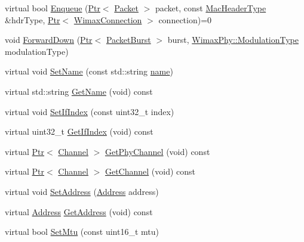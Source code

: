 \begin{DoxyCompactItemize}
\item 
virtual bool \hyperlink{classns3_1_1WimaxNetDevice_a72a88b990dc72d44713cdb170d304e83}{Enqueue} (\hyperlink{classns3_1_1Ptr}{Ptr}$<$ \hyperlink{classns3_1_1Packet}{Packet} $>$ packet, const \hyperlink{classns3_1_1MacHeaderType}{Mac\+Header\+Type} \&hdr\+Type, \hyperlink{classns3_1_1Ptr}{Ptr}$<$ \hyperlink{classns3_1_1WimaxConnection}{Wimax\+Connection} $>$ connection)=0
\item 
void \hyperlink{classns3_1_1WimaxNetDevice_af484194cd18f49cb532794513636f2b9}{Forward\+Down} (\hyperlink{classns3_1_1Ptr}{Ptr}$<$ \hyperlink{classns3_1_1PacketBurst}{Packet\+Burst} $>$ burst, \hyperlink{classns3_1_1WimaxPhy_a044c5d8a48ca992c39c2a946f6e755fa}{Wimax\+Phy\+::\+Modulation\+Type} modulation\+Type)
\item 
virtual void \hyperlink{classns3_1_1WimaxNetDevice_a3e606df0807d4d5e45716fb138dc888e}{Set\+Name} (const std\+::string \hyperlink{generate__test__data__lte__spectrum__model_8m_ab74e6bf80237ddc4109968cedc58c151}{name})
\item 
virtual std\+::string \hyperlink{classns3_1_1WimaxNetDevice_a013da267d69cff1f08f04eea031f2d98}{Get\+Name} (void) const 
\item 
virtual void \hyperlink{classns3_1_1WimaxNetDevice_a4aad711890d681c43a710c6d52d8db48}{Set\+If\+Index} (const uint32\+\_\+t index)
\item 
virtual uint32\+\_\+t \hyperlink{classns3_1_1WimaxNetDevice_ab4198f8199d25995168ee18eb60db937}{Get\+If\+Index} (void) const 
\item 
virtual \hyperlink{classns3_1_1Ptr}{Ptr}$<$ \hyperlink{classns3_1_1Channel}{Channel} $>$ \hyperlink{classns3_1_1WimaxNetDevice_abbd7ff170f367e0e6e980c5b0d3ab81e}{Get\+Phy\+Channel} (void) const 
\item 
virtual \hyperlink{classns3_1_1Ptr}{Ptr}$<$ \hyperlink{classns3_1_1Channel}{Channel} $>$ \hyperlink{classns3_1_1WimaxNetDevice_a3342f369d5003e8ef153c93d67f0c526}{Get\+Channel} (void) const 
\item 
virtual void \hyperlink{classns3_1_1WimaxNetDevice_a8bc96ce718e01ffe085270baf3140021}{Set\+Address} (\hyperlink{classns3_1_1Address}{Address} address)
\item 
virtual \hyperlink{classns3_1_1Address}{Address} \hyperlink{classns3_1_1WimaxNetDevice_af4d9169ba066258ec02cb6413f4796f3}{Get\+Address} (void) const 
\item 
virtual bool \hyperlink{classns3_1_1WimaxNetDevice_a6ef797e785068a32f97c4f80f62a6050}{Set\+Mtu} (const uint16\+\_\+t mtu)

\end{DoxyCompactItemize}
